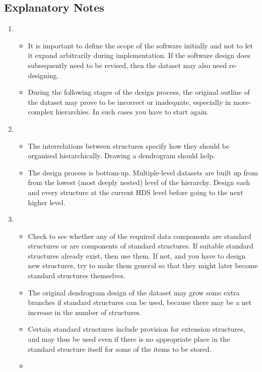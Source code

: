 \subsection{Explanatory Notes\label{se:newexn}}

\begin{enumerate}
\item
\begin{itemize}
\item
It is important to define the scope of the software initially and not to
let it expand arbitrarily during implementation.  If the software design
does subsequently need to be revised, then the dataset may also need
re-designing. 
\item
During the following stages of the design process, the original outline of
the dataset may prove to be incorrect or inadequate, especially in
more-complex hierarchies.  In such cases you have to start again.
\end{itemize}
\item
\begin{itemize}
\item
The interrelations between structures specify how they should be
organised hierarchically.  Drawing a dendrogram should help. 
\item
The design process is bottom-up.
Multiple-level datasets are built up from from the lowest (most deeply
nested) level of the hierarchy.  Design each and every structure at
the current HDS level before going to the next higher level.
\end{itemize}
\item
\begin{itemize}
\item
Check to see whether any of the required data components
are standard structures or are components of standard
structures.  If suitable standard
structures already exist, then use them.
If not, and you have to design new structures, try to make
them general so that they might later become
standard structures themselves.
\item
The original dendrogram design of the dataset may grow some
extra branches if standard structures can be used, because 
there may be a net increase in the number of structures.
\item
Certain standard structures include provision for extension
structures, and may thus
be used even if there is no
appropriate place in the standard structure itself
for some of the items to be stored.
\item

\end{itemize}
\end{enumerate}
